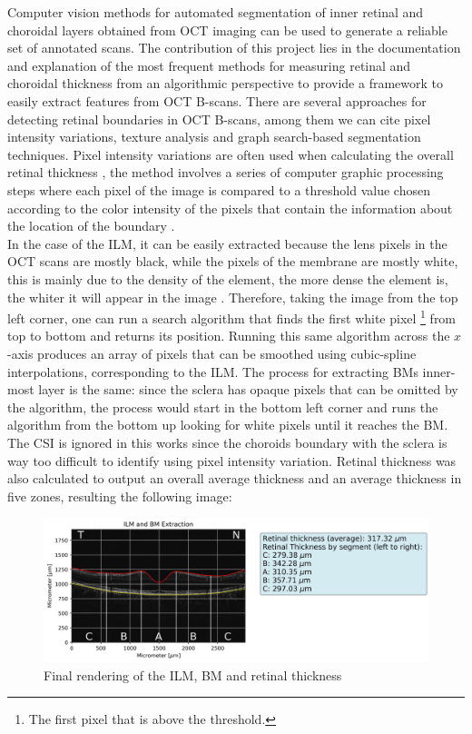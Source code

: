 \documentclass[12pt,a4paper]{scrartcl}
\begin{document}
Computer vision methods for automated segmentation of inner retinal and choroidal layers obtained from OCT imaging \cite{Ronchetti2019statistic} can be used to generate a reliable set of annotated scans. 
The contribution of this project lies in the documentation and explanation of the most frequent methods for measuring retinal and choroidal thickness from an algorithmic perspective to provide a framework to easily extract features from OCT B-scans. 
There are several approaches for detecting retinal boundaries in OCT B-scans, among them we can cite pixel intensity variations, texture analysis and graph search-based segmentation techniques. Pixel intensity variations are often used when calculating the overall retinal thickness \cite{Alonso-Caneiro2013}, the method involves a series of computer graphic processing steps where each pixel of the image is compared to a threshold value chosen according to the color intensity of the pixels that contain the information about the location of the boundary \cite{Fabritius:09}. 
\\
In the case of the ILM, it can be easily extracted because the lens pixels in the OCT scans are mostly black, while the pixels of the membrane are mostly white, this is mainly due to the density of the element, the more dense the element is, the whiter it will appear in the image \cite{Brar597}. Therefore, taking the image from the top left corner, one can run a search algorithm that finds the first white pixel \footnote{The first pixel that is above the threshold.} from top to bottom and returns its position. Running this same algorithm across the $x$-axis produces an array of pixels that can be smoothed using cubic-spline interpolations, corresponding to the ILM. The process for extracting BM\textquotesingle s inner-most layer is the same: since the sclera has opaque pixels that can be omitted by the algorithm, the process would start in the bottom left corner and runs the algorithm from the bottom up looking for white pixels until it reaches the BM. The CSI is ignored in this works since the choroid\textquotesingle s boundary with the sclera is way too difficult to identify using pixel intensity variation. 
Retinal thickness was also calculated to output an overall average thickness and an average thickness in five zones, resulting the following image:

\begin{figure}[H]
    \centering
    \includegraphics[width=1\textwidth]{./images/ILM_BM_Extracted.png}
    \caption{Final rendering of the ILM, BM and retinal thickness}
    \label{fig:final_rendering}
\end{figure}
\end{document}
